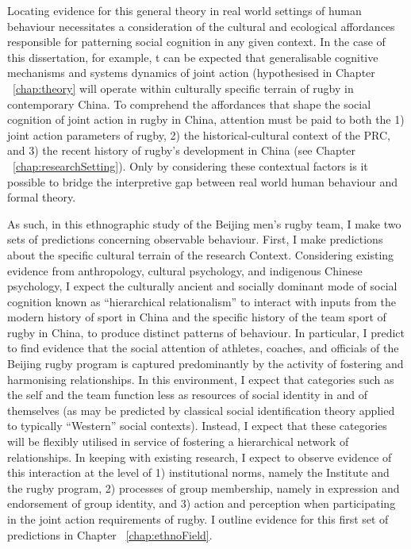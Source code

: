 \begin{CJK}{UTF8}{gbsn}
Locating evidence for this general theory in real world settings of human behaviour necessitates a consideration of the cultural and ecological affordances responsible for patterning social cognition in any given context.  In the case of this dissertation, for example, t can be expected that generalisable cognitive mechanisms and systems dynamics of joint action (hypothesised in Chapter ~\ref{chap:theory} will operate within culturally specific terrain of rugby in contemporary China.  To comprehend the affordances that shape the social cognition of joint action in rugby in China, attention must be paid to both the 1) joint action parameters of rugby, 2) the historical-cultural context of the PRC, and 3) the recent history of rugby's development in China (see Chapter ~\ref{chap:researchSetting}).  Only by considering these contextual factors is it possible to bridge the interpretive gap between real world human behaviour and formal theory.

As such, in this ethnographic study of the Beijing men's rugby team, I make two sets of predictions concerning observable behaviour.  First, I make predictions about the specific cultural terrain of the research Context.  Considering existing evidence from anthropology, cultural psychology, and indigenous Chinese psychology, I expect the culturally ancient and socially dominant mode of social cognition known as ``hierarchical relationalism'' to interact with inputs from the modern history of sport in China and the specific history of the team sport of rugby in China, to produce distinct patterns of behaviour. In particular, I predict to find evidence that the social attention of athletes, coaches, and officials of the Beijing rugby program is captured predominantly by the activity of fostering and harmonising relationships.  In this environment, I expect that categories such as the self and the team function less as resources of social identity in and of themselves (as may be predicted by classical social identification theory applied to typically ``Western'' social contexts).  Instead, I expect that these categories will be flexibly utilised in service of fostering a hierarchical network of relationships.  In keeping with existing research, I expect to observe evidence of this interaction at the level of 1) institutional norms, namely the Institute and the rugby program, 2) processes of group membership, namely in expression and endorsement of group identity, and 3) action and perception when participating in the joint action requirements of rugby.  I outline evidence for this first set of predictions in Chapter ~\ref{chap:ethnoField}.


\end{CJK}

